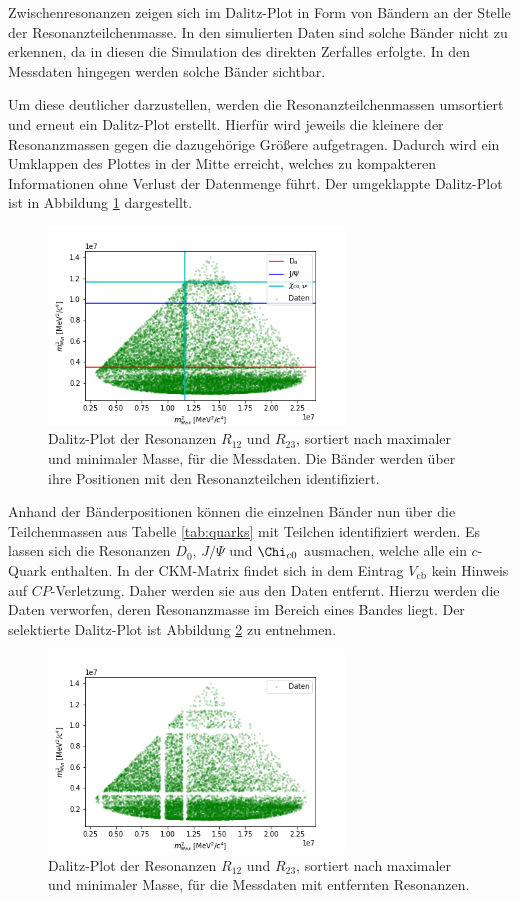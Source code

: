 \FloatBarrier
Zwischenresonanzen zeigen sich im Dalitz-Plot in Form von Bändern an der Stelle der Resonanzteilchenmasse. In den simulierten Daten sind solche Bänder nicht zu erkennen, da in diesen die Simulation des direkten Zerfalles erfolgte. In den Messdaten hingegen werden solche Bänder sichtbar.

Um diese deutlicher darzustellen, werden die Resonanzteilchenmassen umsortiert und erneut ein Dalitz-Plot erstellt. Hierfür wird jeweils die kleinere der Resonanzmassen gegen die dazugehörige Größere aufgetragen. Dadurch wird ein Umklappen des Plottes in der Mitte erreicht, welches zu kompakteren Informationen ohne Verlust der Datenmenge führt. Der umgeklappte Dalitz-Plot ist in Abbildung \ref{fig:Dalitz_klapp} dargestellt.
\begin{figure}
  \centering
  \includegraphics[width=0.7\textwidth]{plots/dalitz_real_MinMax.png}
  \caption{Dalitz-Plot der Resonanzen $R_{12}$ und $R_{23}$, sortiert nach maximaler und minimaler Masse, für die Messdaten. Die Bänder werden über ihre Positionen mit den Resonanzteilchen identifiziert.}
  \label{fig:Dalitz_klapp}
\end{figure} 
\FloatBarrier
Anhand der Bänderpositionen können die einzelnen Bänder nun über die Teilchenmassen aus Tabelle \ref{tab:quarks} mit Teilchen identifiziert werden. Es lassen sich die Resonanzen $D_0$, $J/\Psi$ und $\Chi_{c0}$ ausmachen, welche alle ein $c$-Quark enthalten.
In der CKM-Matrix findet sich in dem Eintrag $V_\mathrm{cb}$ kein Hinweis auf $CP$-Verletzung.
Daher werden sie aus den Daten entfernt. Hierzu werden die Daten verworfen, deren Resonanzmasse im Bereich eines Bandes liegt. Der selektierte Dalitz-Plot ist Abbildung \ref{fig:Dalitz_sel} zu entnehmen.
\begin{figure}
  \centering
  \includegraphics[width=0.7\textwidth]{plots/dalitz_real_MinMax_ohnec.png}
  \caption{Dalitz-Plot der Resonanzen $R_{12}$ und $R_{23}$, sortiert nach maximaler und minimaler Masse, für die Messdaten mit entfernten Resonanzen.}
  \label{fig:Dalitz_sel}
\end{figure} 
